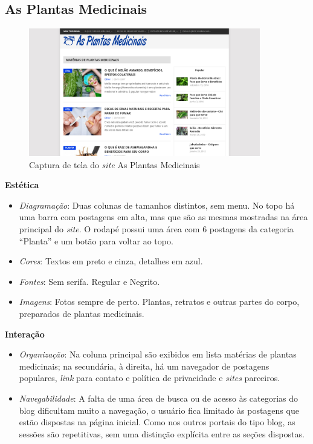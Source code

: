 \subsection{As Plantas Medicinais}\label{as-plantas-medicinais}

\begin{figure}
\centering
\caption{\label{fig-plantasmedicinais}Captura de tela do \emph{site} As Plantas Medicinais}
\includegraphics[width=0.9\textwidth]{images/similares/asplantasmedicinais.png}
\end{figure}

\textbf{Estética}

\begin{itemize}
\item
  \emph{Diagramação}: Duas colunas de tamanhos distintos, sem menu. No topo há uma barra com postagens em alta, mas que são as mesmas mostradas na área principal do \emph{site}. O rodapé possui uma área com 6 postagens da categoria ``Planta'' e um botão para voltar ao topo.
\item
  \emph{Cores}: Textos em preto e cinza, detalhes em azul.
\item
  \emph{Fontes}: Sem serifa. Regular e Negrito.
\item
  \emph{Imagens}: Fotos sempre de perto. Plantas, retratos e outras partes do corpo, preparados de plantas medicinais.
\end{itemize}

\textbf{Interação}

\begin{itemize}
\item
  \emph{Organização}: Na coluna principal são exibidos em lista matérias de plantas medicinais; na secundária, à direita, há um navegador de postagens populares, \emph{link} para contato e política de privacidade e \emph{sites} parceiros.
\item
  \emph{Navegabilidade}: A falta de uma área de busca ou de acesso às categorias do blog dificultam muito a navegação, o usuário fica limitado às postagens que estão dispostas na página inicial. Como nos outros portais do tipo blog, as sessões são repetitivas, sem uma distinção explícita entre as seções dispostas.
\end{itemize}

